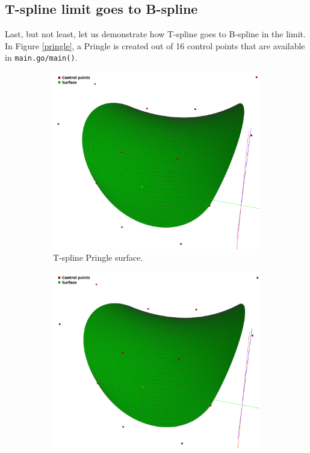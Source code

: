 \documentclass{article}
\begin{document}
\subsection{T-spline limit goes to B-spline}

\vspace{6pt}

Last, but not least, let us demonstrate how T-spline goes to B-spline in the limit. In Figure \ref{pringle}, a Pringle is created out of 16 control points that are available in \texttt{main.go/main()}.

\begin{figure}[H]
\centering
\begin{subfigure}[b]{0.48\textwidth}
\includegraphics[width=\textwidth]{pringle_tspline}
\caption{T-spline Pringle surface.}
\label{pringlet}
\end{subfigure}
\begin{subfigure}[b]{0.48\textwidth}
\includegraphics[width=\textwidth]{pringle_bspline}

\end{subfigure}
\end{figure}
\end{document}
